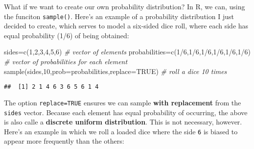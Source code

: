 \documentclass[
]{book}
\newenvironment{Shaded}{\begin{snugshade}}{\end{snugshade}}
\newcommand{\AttributeTok}[1]{\textcolor[rgb]{0.77,0.63,0.00}{#1}}
\newcommand{\CommentTok}[1]{\textcolor[rgb]{0.56,0.35,0.01}{\textit{#1}}}
\newcommand{\ConstantTok}[1]{\textcolor[rgb]{0.00,0.00,0.00}{#1}}
\newcommand{\DecValTok}[1]{\textcolor[rgb]{0.00,0.00,0.81}{#1}}
\newcommand{\FunctionTok}[1]{\textcolor[rgb]{0.00,0.00,0.00}{#1}}
\newcommand{\NormalTok}[1]{#1}
\newcommand{\OtherTok}[1]{\textcolor[rgb]{0.56,0.35,0.01}{#1}}
\newcommand{\SpecialCharTok}[1]{\textcolor[rgb]{0.00,0.00,0.00}{#1}}
\begin{document}
What if we want to create our own probability distribution? In R, we can, using the funciton \texttt{sample()}. Here's an example of a probability distribution I just decided to create, which serves to model a six-sided dice roll, where each side has equal probability (1/6) of being obtained:

\begin{Shaded}
\begin{Highlighting}[]
\NormalTok{sides}\OtherTok{=}\FunctionTok{c}\NormalTok{(}\DecValTok{1}\NormalTok{,}\DecValTok{2}\NormalTok{,}\DecValTok{3}\NormalTok{,}\DecValTok{4}\NormalTok{,}\DecValTok{5}\NormalTok{,}\DecValTok{6}\NormalTok{) }\CommentTok{\# vector of elements}
\NormalTok{probabilities}\OtherTok{=}\FunctionTok{c}\NormalTok{(}\DecValTok{1}\SpecialCharTok{/}\DecValTok{6}\NormalTok{,}\DecValTok{1}\SpecialCharTok{/}\DecValTok{6}\NormalTok{,}\DecValTok{1}\SpecialCharTok{/}\DecValTok{6}\NormalTok{,}\DecValTok{1}\SpecialCharTok{/}\DecValTok{6}\NormalTok{,}\DecValTok{1}\SpecialCharTok{/}\DecValTok{6}\NormalTok{,}\DecValTok{1}\SpecialCharTok{/}\DecValTok{6}\NormalTok{) }\CommentTok{\# vector of probabilities for each element}
\FunctionTok{sample}\NormalTok{(sides,}\DecValTok{10}\NormalTok{,}\AttributeTok{prob=}\NormalTok{probabilities,}\AttributeTok{replace=}\ConstantTok{TRUE}\NormalTok{) }\CommentTok{\# roll a dice 10 times}
\end{Highlighting}
\end{Shaded}

\begin{verbatim}
##  [1] 2 1 4 6 3 6 5 6 1 4
\end{verbatim}

The option \texttt{replace=TRUE} ensures we can sample \textbf{with replacement} from the \texttt{sides} vector. Because each element has equal probability of occurring, the above is also calle a \textbf{discrete uniform distribution}. This is not necessary, however. Here's an example in which we roll a loaded dice where the side \texttt{6} is biased to appear more frequently than the others:
\end{document}
